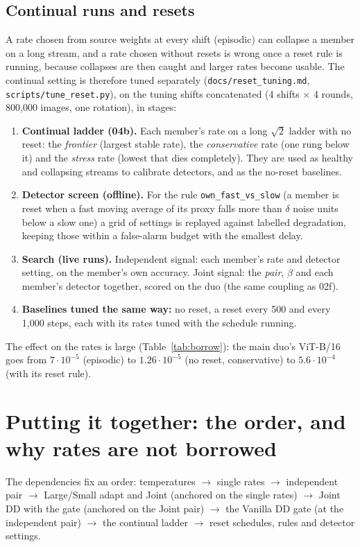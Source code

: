 \documentclass[10pt]{article}
\newcommand{\rl}[1]{\texttt{#1}}
\newcommand{\vit}{ViT-B/16}
\newcommand{\lr}[2]{\(#1{\cdot}10^{#2}\)}
\begin{document}
\subsection{Continual runs and resets}\label{sec:reset}
A rate chosen from source weights at every shift (episodic) can collapse a member on a long stream, and a rate chosen without resets is wrong once a reset rule is running, because collapses are then caught and larger rates become usable. The continual setting is therefore tuned separately (\rl{docs/reset\_tuning.md}, \rl{scripts/tune\_reset.py}), on the tuning shifts concatenated (4 shifts \(\times\) 4 rounds, 800,000 images, one rotation), in stages:
\begin{enumerate}
  \item \textbf{Continual ladder (04b).} Each member's rate on a long \(\sqrt2\) ladder with no reset: the \emph{frontier} (largest stable rate), the \emph{conservative} rate (one rung below it) and the \emph{stress} rate (lowest that dies completely). They are used as healthy and collapsing streams to calibrate detectors, and as the no-reset baselines.
  \item \textbf{Detector screen (offline).} For the rule \rl{own\_fast\_vs\_slow} (a member is reset when a fast moving average of its proxy falls more than \(\delta\) noise units below a slow one) a grid of settings is replayed against labelled degradation, keeping those within a false-alarm budget with the smallest delay.
  \item \textbf{Search (live runs).} Independent signal: each member's rate and detector setting, on the member's own accuracy. Joint signal: the \emph{pair}, \(\beta\) and each member's detector together, scored on the duo (the same coupling as 02f).
  \item \textbf{Baselines tuned the same way:} no reset, a reset every 500 and every 1,000 steps, each with its rates tuned with the schedule running.
\end{enumerate}
The effect on the rates is large (Table~\ref{tab:borrow}): the main duo's \vit{} goes from \lr{7}{-5} (episodic) to \lr{1.26}{-5} (no reset, conservative) to \lr{5.6}{-4} (with its reset rule).

\section{Putting it together: the order, and why rates are not borrowed}\label{sec:borrow}
The dependencies fix an order: temperatures \(\rightarrow\) single rates \(\rightarrow\) independent pair \(\rightarrow\) Large/Small adapt and Joint (anchored on the single rates) \(\rightarrow\) Joint DD with the gate (anchored on the Joint pair) \(\rightarrow\) the Vanilla DD gate (at the independent pair) \(\rightarrow\) the continual ladder \(\rightarrow\) reset schedules, rules and detector settings.
\end{document}
